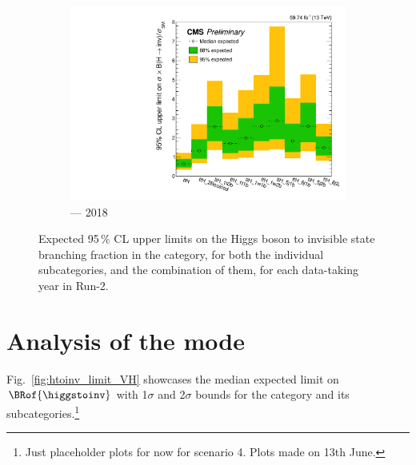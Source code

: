 \begin{figure}[htbp]
    \begin{subfigure}[b]{0.45\textwidth}
        \includegraphics[width=\textwidth]{figures/limits/ttH/limit_2018_ttH_Scenario5.pdf}
        \caption{\ttH --- 2018}
    \end{subfigure}
    \caption[Expected 95\,\% CL upper limits on the Higgs boson to invisible state branching fraction in the \ttH category, for both the individual subcategories, and the combination of them, for each data-taking year in Run-2]{Expected 95\,\% CL upper limits on the Higgs boson to invisible state branching fraction in the \ttH category, for both the individual subcategories, and the combination of them, for each data-taking year in Run-2.}
    \label{fig:htoinv_limit_ttH}
\end{figure}




\section{Analysis of the \texorpdfstring{\VH}{VH} mode}
\label{sec:htoinv_analysis_VH}


Fig.~\ref{fig:htoinv_limit_VH} showcases the median expected limit on $\BRof{\higgstoinv}$ with 1$\sigma$ and 2$\sigma$ bounds for the \VH category and its subcategories.\footnote{Just placeholder plots for now for scenario 4. Plots made on 13th June.}


